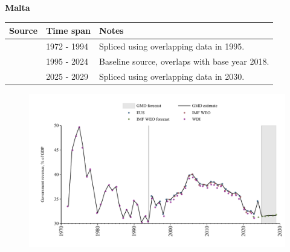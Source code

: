 \documentclass[12pt,a4paper,landscape]{article}
\begin{document}
\begin{adjustbox}{max totalsize={\paperwidth}{\paperheight},center}
\begin{minipage}[t][\textheight][t]{\textwidth}
\vspace*{0.5cm}
{}
\begin{center}
{\Large\bfseries Malta}
\end{center}
\vspace{0.5cm}
\begin{table}[H]
\centering
\small
\begin{tabular}{|l|l|l|}
\hline
\textbf{Source} & \textbf{Time span} & \textbf{Notes} \\
\hline
\rowcolor{white}\cite{WDI}& 1972 - 1994 &Spliced using overlapping data in 1995.\\
\rowcolor{lightgray}\cite{EUS}& 1995 - 2024 &Baseline source, overlaps with base year 2018.\\
\rowcolor{white}\cite{IMF_WEO_forecast}& 2025 - 2029 &Spliced using overlapping data in 2030.\\
\hline
\end{tabular}
\end{table}
\begin{figure}[H]
\centering
\includegraphics[width=\textwidth,height=0.6\textheight,keepaspectratio]{graphs/MLT_govrev_GDP.pdf}
\end{figure}
\end{minipage}
\end{adjustbox}
\end{document}

